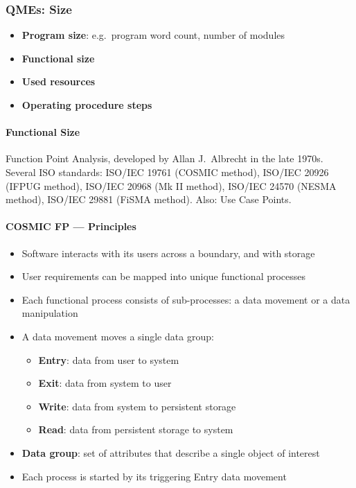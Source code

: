 \subsubsection{QMEs: Size}

\begin{itemize}
  \item \textbf{Program size}: e.g.\ program word count, number of modules
  \item \textbf{Functional size}
  \item \textbf{Used resources}
  \item \textbf{Operating procedure steps}
\end{itemize}

\paragraph{Functional Size}
Function Point Analysis, developed by Allan J.\ Albrecht in the late 1970s.
Several ISO standards:
ISO/IEC 19761 (COSMIC method), ISO/IEC 20926 (IFPUG method), ISO/IEC 20968 (Mk II method),
ISO/IEC 24570 (NESMA method), ISO/IEC 29881 (FiSMA method). Also: Use Case Points.

\paragraph{COSMIC FP — Principles}
\begin{itemize}
  \item Software interacts with its users across a boundary, and with storage
  \item User requirements can be mapped into unique functional processes
  \item Each functional process consists of sub-processes: a data movement or a data
        manipulation
  \item A data movement moves a single data group:
        \begin{itemize}
          \item \textbf{Entry}: data from user to system
          \item \textbf{Exit}: data from system to user
          \item \textbf{Write}: data from system to persistent storage
          \item \textbf{Read}: data from persistent storage to system
        \end{itemize}
  \item \textbf{Data group}: set of attributes that describe a single object of interest
  \item Each process is started by its triggering Entry data movement
\end{itemize}

